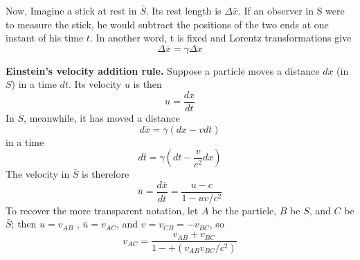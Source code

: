 \documentclass[../../main.tex]{subfiles}
\begin{document}
Now, Imagine a stick at rest in $\bar{S}$. Its rest length is $\Delta \bar{x}$. If an observer in S were to measure the stick, he would subtract the positions of the two ends at one instant of his time $t$. In another word, t is fixed and Lorentz transformations give
\begin{equation*}
    \Delta \bar{x}=\gamma \Delta x
\end{equation*}

\textbf{Einstein's velocity addition rule.} Suppose a particle moves a distance $dx$ (in $S$) in a time $dt$. Its velocity $u$ is then
\begin{equation*}
    u=\frac{dx}{dt}
\end{equation*}
In $\bar{S}$, meanwhile, it has moved a distance
\begin{equation*}
    d\bar{x}=\gamma(dx-vdt)
\end{equation*}
in a time 
\begin{equation*}
    d\bar{t}=\gamma (dt-\frac{v}{c^2}dx)
\end{equation*}
The velocity in $\bar{S}$ is therefore
\begin{equation*}
    \bar{u}=\frac{d\bar{x}}{d\bar{t}}=\frac{u-c}{1-uv/c^2}
\end{equation*}
To recover the more transparent notation, let $A$ be the particle, $B$ be $S$, and $C$ be $\bar{S}$; then $u = v_{AB}$ , $\bar{u} = v_{AC}$, and $v = v_{C B} = -v_{BC}$, so 
\begin{equation*}
    v_{AC}=\frac{v_{AB}+v_{BC}}{1-+(v_{AB}v_{BC}/c^2)}
\end{equation*}
\end{document}
